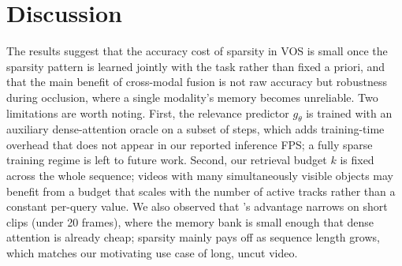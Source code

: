 \section{Discussion}
The results suggest that the accuracy cost of sparsity in VOS is small once the sparsity pattern is learned jointly with the task rather than fixed a priori, and that the main benefit of cross-modal fusion is not raw accuracy but robustness during occlusion, where a single modality's memory becomes unreliable. Two limitations are worth noting. First, the relevance predictor $g_\theta$ is trained with an auxiliary dense-attention oracle on a subset of steps, which adds training-time overhead that does not appear in our reported inference FPS; a fully sparse training regime is left to future work. Second, our retrieval budget $k$ is fixed across the whole sequence; videos with many simultaneously visible objects may benefit from a budget that scales with the number of active tracks rather than a constant per-query value. We also observed that \methodname{}'s advantage narrows on short clips (under 20 frames), where the memory bank is small enough that dense attention is already cheap; sparsity mainly pays off as sequence length grows, which matches our motivating use case of long, uncut video.
